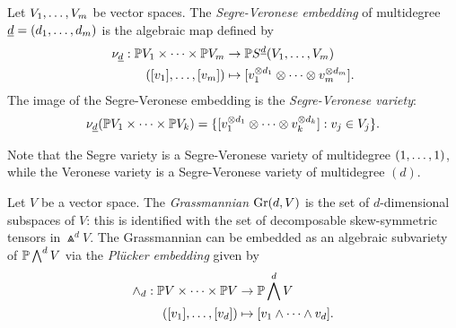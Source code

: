 \begin{definition}
\label{introduction-definition-SegreVeronese}

Let $V_1 , \ldots , V_m$ be vector spaces. The \emph{Segre-Veronese embedding} of multidegree $\underline{d} = (d_1 , \ldots , d_m)$ is the algebraic map defined by 
\begin{align*}
\nu_{\underline{d}} : \mathbb{P} V_1 \times \cdots \times \mathbb{P} V_m &\to \mathbb{P} S^{\underline{d}}(V_1,\ldots,V_m) \\
([v_1] , \ldots , [v_m]) &\mapsto [v_1^{\otimes d_1} \otimes \cdots \otimes v_m^{\otimes d_m}].
\end{align*}
The image of the Segre-Veronese embedding is the \emph{Segre-Veronese variety}:
\[
\nu_{\underline{d}}( \mathbb{P} V_1 \times \cdots \times \mathbb{P} V_k ) = \{ [v_1^{\otimes d_1} \otimes \cdots \otimes v_k^{\otimes d_k}] :  v_j \in V_j\}.
\]
\end{definition}
Note that the Segre variety is a Segre-Veronese variety of multidegree $(1 , \ldots , 1)$, while the Veronese variety is a Segre-Veronese variety of multidegree $(d)$.

\begin{definition}[Grassmannian]\label{introduction-definition-Grassmannian}
    Let $V$ be a vector space. The \emph{Grassmannian} $\mathrm{Gr}(d,V)$ is the set of $d$-dimensional subspaces of $V$: this is identified with the set of decomposable skew-symmetric tensors in $\Wedge^dV$. The Grassmannian can be embedded as an algebraic subvariety of $\mathbb{P} \bigwedge^dV$ via the \emph{Pl\"ucker embedding} given by 
    \begin{align*}
    \wedge_{d} : \mathbb{P} V \times \cdots \times \mathbb{P} V &\to \mathbb{P} \bigwedge^{d}V \\
    ([v_1] , \ldots , [v_d]) &\mapsto [v_1 \wedge \dots \wedge v_d].
    \end{align*}
\end{definition}    

